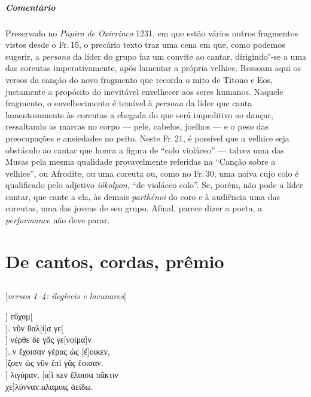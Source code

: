 {\paragraph{Comentário} Preservado no \emph{Papiro de Oxirrinco} 1231, em que estão vários
outros fragmentos vistos desde o Fr.\,15, o precário texto traz uma
cena em que, como podemos sugerir, a \emph{persona} da líder do grupo
faz um convite ao cantar, dirigindo"-se a uma das coreutas
imperativamente, após lamentar a própria velhice. Ressoam aqui os versos
da canção do novo fragmento que recorda o mito de Titono e Eos,
justamente a propósito do inevitável envelhecer aos seres humanos.
Naquele fragmento, o envelhecimento é temível à \emph{persona} da líder que canta lamentosamente às
coreutas a chegada do que será impeditivo ao dançar, ressaltando as
marcas no corpo --- pele, cabelos, joelhos --- e o peso das
preocupações e ansiedades no peito. Neste Fr.\,21, é possível que a
velhice seja obstáculo ao cantar que honra a figura de ``colo violáceo''
--- talvez uma das Musas pela mesma qualidade provavelmente referidas na
``Canção sobre a velhice'', ou Afrodite, ou uma coreuta
ou, como no Fr.\,30, uma noiva cujo colo é qualificado pelo adjetivo \emph{iókolpon}, ``de violáceo colo''. Se, porém, não pode a líder cantar, que
cante a ela, às demais \emph{parthénoi} do coro e à audiência uma das
coreutas, uma das jovens de seu grupo. Afinal, parece dizer a poeta, a
\emph{performance} não deve parar.}


\chapter[De cantos, cordas, prêmio: a imortalidade?]{De cantos, cordas, prêmio}


\section*{}

\begin{gkverse}
\textnormal{[\emph{versos 1--4: ilegíveis e lacunares}]}

      ] εὔχομ[\\
]. νῦν θαλ[ί]α γε[\\
] νέρθε δὲ γᾶς γε[νοίμα]ν\\
]..ν ἔχοισαν γέρας ὠς [ἔ]οικεν,\\
]ζοεν ὠς νῦν ἐπὶ γᾶς ἔοισαν.\\
] λιγύραν, [α]ἴ κεν ἔλοισα πᾶκτιν\\
        χε]λύνναν.αλαμοις ἀείδω. 
\end{gkverse}


